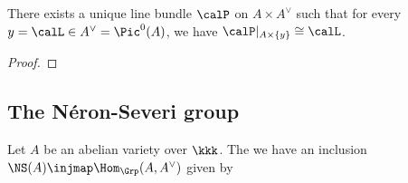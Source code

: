     \begin{proposition}\label{prop: the Poincare line bundle}
        There exists a unique line bundle \(\calP\) on \(A \times A^\vee\) such that for every \(y = \calL \in A^\vee = \Pic^0(A)\), we have \(\calP|_{A \times \{y\}} \cong \calL\).
    \end{proposition}
    \begin{proof}
    \end{proof}


\subsection{The N\'eron-Severi group}


    \begin{theorem}\label{thm:NS_A_as_homomorphisms_from_A_to_A_dual}
        Let \(A\) be an abelian variety over \(\kkk\).
        The we have an inclusion \(\NS(A) \injmap \Hom_{\Grp}(A, A^\vee)\) given by 
    \end{theorem}